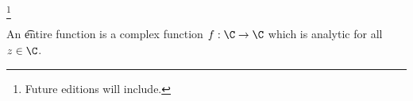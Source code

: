 
\footnote{Future editions will include.}


An \t{entire function} is a complex function $f: \C \to \C$ which is analytic for all $z \in \C$.


\blankpage
